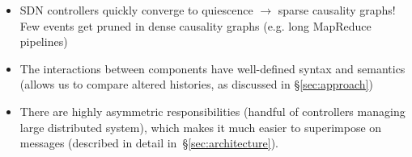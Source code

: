 \begin{itemize}
\item SDN controllers quickly converge to quiescence $\rightarrow$ sparse causality graphs! Few events get pruned in  dense causality graphs (e.g. long MapReduce pipelines)
\item The interactions between components have well-defined syntax and
semantics (allows us to compare altered histories, as discussed in
\S\ref{sec:approach})
\item There are highly asymmetric responsibilities (handful of controllers
managing large distributed system), which makes it much easier to superimpose
on messages (described in detail in~\S\ref{sec:architecture}).
\end{itemize}

